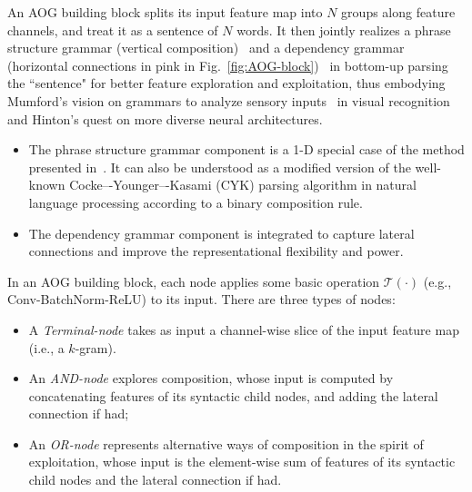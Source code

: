 \documentclass[10pt,twocolumn,letterpaper]{article}
\begin{document}
 An AOG building block splits its input feature map into $N$ groups along feature channels, and treat it as a sentence of $N$ words. It then jointly realizes a phrase structure grammar (vertical composition)~\cite{Syntactic, Geman_CompositionSystems,DPM,Zhu_Grammar,Yuille_AndOr,DisAOT-CVPR} and a dependency grammar (horizontal connections in pink in Fig.~\ref{fig:AOG-block})~\cite{DependencyGrammar,Zhu_Grammar,RCN} in bottom-up parsing the ``sentence" for better feature exploration and exploitation, thus embodying Mumford's vision on grammars to analyze sensory inputs~\cite{Mumford} in visual recognition and Hinton's quest on more diverse neural architectures.  
 \begin{itemize}[leftmargin=*]
 \itemsep0em
     \item The phrase structure grammar component is a 1-D special case of the method presented in~\cite{DisAOT-CVPR, TLP-PAMI}. It can also be understood as a modified version of the well-known Cocke–-Younger–-Kasami (CYK) parsing algorithm in natural language processing according to a binary composition rule. 
     \item The dependency grammar component is integrated to capture lateral connections and improve the representational flexibility and power. 
 \end{itemize}

In an AOG building block, each node applies some basic operation $\mathcal{T}(\cdot)$ (e.g., Conv-BatchNorm-ReLU) to its input. There are three types of nodes: 
\begin{itemize}[leftmargin=*]
 \itemsep0em
    \item A \textit{Terminal-node} takes as input a channel-wise slice of the input feature map (i.e., a $k$-gram). 
    \item An \textit{AND-node} explores composition, whose input is computed by concatenating features of its syntactic child nodes, and adding the lateral connection if had;
    \item An \textit{OR-node} represents alternative ways of composition in the spirit of exploitation, whose input is the element-wise sum of features of its syntactic child nodes and the lateral connection if had.
\end{itemize}
\end{document}
